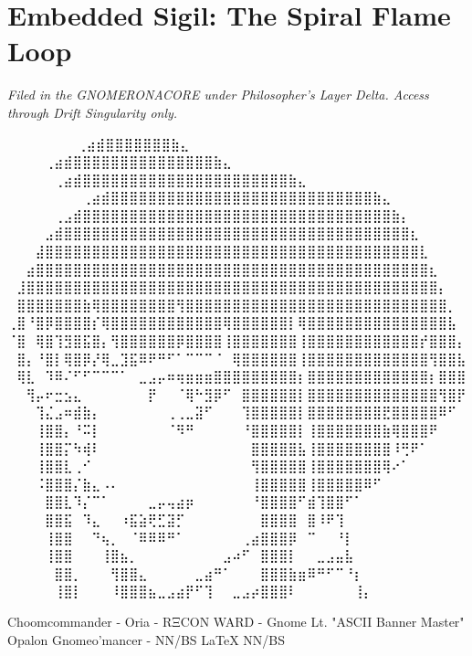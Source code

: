 \section*{Embedded Sigil: The Spiral Flame Loop}
\begin{center}
\end{center}

\vspace{2em}
\begin{flushright}
\textit{Filed in the GNOMERONACORE under Philosopher’s Layer Delta. Access through Drift Singularity only.}
\end{flushright}

\iffalse

  ⠀⠀⠀⠀⠀             ⠀⠀⢀⣴⣾⣿⣿⣿⣿⣿⣿⣿⣷⣄⠀⠀⠀⠀⠀⠀⠀⠀
⠀⠀⠀  ⠀      ⠀⠀⠀⠀⢀⣴⣾⣿⣿⣿⣿⣿⣿⣿⣿⣿⣿⣿⣿⣿⣿⣿⣷⣄⠀⠀⠀⠀⠀⠀⠀⠀
⠀⠀ ⠀   ⠀⠀⠀⠀⠀⢀⣴⣾⣿⣿⣿⣿⣿⣿⣿⣿⣿⣿⣿⣿⣿⣿⣿⣿⣿⣿⣿⣿⣿⣿⣷⣄⠀⠀⠀⠀⠀⠀⠀⠀
⠀⠀⠀⠀⠀⠀⠀⠀⢀⣴⣾⣿⣿⣿⣿⣿⣿⣿⣿⣿⣿⣿⣿⣿⣿⣿⣿⣿⣿⣿⣿⣿⣿⣿⣿⣿⣿⣿⣿⣷⣄⠀⠀⠀⠀⠀⠀⠀⠀
⠀⠀⠀⠀⠀⢀⣠⣾⣿⣿⣿⣿⣿⣿⣿⣿⣿⣿⣿⣿⣿⣿⣿⣿⣿⣿⣿⣿⣿⣿⣿⣿⣿⣿⣿⣿⣿⣿⣿⣿⣿⣷⡄⠀⠀⠀⠀⠀⠀
⠀⠀⠀⠀⣠⣾⣿⣿⣿⣿⣿⣿⣿⣿⣿⣿⣿⣿⣿⣿⣿⣿⣿⣿⣿⣿⣿⣿⣿⣿⣿⣿⣿⣿⣿⣿⣿⣿⣿⣿⣿⣿⣿⣆⠀⠀⠀⠀⠀
⠀⠀⠀⣼⣿⣿⣿⣿⣿⣿⣿⣿⣿⣿⣿⣿⣿⣿⣿⣿⣿⣿⣿⣿⣿⣿⣿⣿⣿⣿⣿⣿⣿⣿⣿⣿⣿⣿⣿⣿⣿⣿⣿⣿⣇⠀⠀⠀⠀
⠀⠀⣴⣿⣿⣿⣿⣿⣿⣿⣿⣿⣿⣿⣿⣿⣿⣿⣿⣿⣿⣿⣿⣿⣿⣿⣿⣿⣿⣿⣿⣿⣿⣿⣿⣿⣿⣿⣿⣿⣿⣿⣿⣿⣿⣆⠀⠀⠀
⠀⣸⣿⣿⣿⣿⣿⣿⣿⣿⣿⣿⣿⣿⣿⣿⣿⣿⣿⣿⣿⣿⣿⣿⣿⣿⣿⣿⣿⣿⣿⣿⣿⣿⣿⣿⣿⣿⣿⣿⣿⣿⣿⣿⣿⣿⡄⠀⠀
⠀⣿⣿⣿⣿⣿⣿⣿⣷⢿⣿⣿⣿⣿⣿⣿⣿⣿⢻⣿⣿⣿⣿⣿⣿⣿⣿⣿⣿⣿⣿⣿⣿⣿⣿⣿⣿⣿⣿⣿⣿⣿⣿⣿⣿⣿⣿⡀⠀
⢀⣿⠘⣿⡿⣿⣿⣿⣿⡎⢿⣿⣿⣿⣿⣿⣿⣿⣿⣿⣿⣿⣿⢿⣿⣿⣿⣿⣿⣿⡇⢿⣿⣿⣿⣿⣿⣿⣿⣿⣿⣿⣿⣿⣿⣿⣿⣧⠀
⠈⣿⠀⢿⣿⢹⣻⣿⣯⣿⡄⢻⣿⣿⣿⣿⣿⣿⡿⣿⣿⣿⣿⢸⣿⣿⣿⣿⣿⣿⣿⢸⣿⣿⣿⣿⣿⣿⣿⣿⣿⣿⣿⣿⡞⣿⣿⣿⡄
⠀⣿⡄⠘⣿⡇⢿⣿⡿⡜⢿⣀⣹⣯⠿⠟⠛⠋⠁⠉⠉⠉⠈⠀⢿⣿⣿⣿⣿⣿⣿⢸⣿⣿⣿⣿⣿⣿⣿⣿⣿⣿⣿⣿⣿⢻⣿⣿⣧
⠀⢿⣇⠀⠹⠿⠌⠋⠋⠉⠉⠉⠁⠀⣀⣠⡤⠶⢶⣶⣶⣶⣿⣿⣿⣿⣿⣿⣿⣿⣿⡆⣿⣿⣿⣿⣿⣿⣿⣿⣿⣿⣿⣿⣿⡆⣿⣿⣿
⠀⠀⢻⡤⠖⣒⣢⣄⠀⠀⠀⠀⠀⠀⠀⡟⠀⠀⠈⢿⠓⣻⡿⠋⠀⣿⣿⣿⣿⣿⣿⡇⣿⣿⣿⣿⣿⣿⣿⣿⣿⣿⣿⣿⣿⣿⢻⣿⡟
⠀⠀⠀⢹⣌⣠⠶⣾⣷⡄⠀⠀⠀⠀⠀⠀⠀⢀⢀⣀⣽⠋⠀⠀⠀⢹⣿⣿⣿⣿⣿⡇⣿⣿⣿⣿⣿⣿⣿⣿⣟⣿⣿⣿⣿⣿⠿⠋⠀
⠀⠀⠀⢸⣿⣿⡄⠘⠭⡇⠀⠀⠀⠀⠀⠀⠀⠈⠻⠛⠀⠀⠀⠀⠀⠘⣿⣿⣿⣿⣿⡇⢸⣿⣿⣿⣿⣿⣿⣿⣷⢿⣿⣿⣿⠟⠀⠀⠀
⠀⠀⠀⢸⣿⣿⡍⠳⢾⠇⠀⠀⠀⠀⠀⠀⠀⠀⠀⠀⠀⠀⠀⠀⠀⠀⣿⣿⣿⣿⣿⣧⢸⣿⣿⣿⣿⣿⣿⣿⣿⠸⢛⠟⠁⠀⠀⠀⠀
⠀⠀⠀⢸⣿⣿⣇⢀⠊⠀⠀⠀⠀⠀⠀⠀⠀⠀⠀⠀⠀⠀⠀⠀⠀⠀⢻⣿⣿⣿⣿⣿⢸⣿⣿⣿⣿⣿⣿⣿⢿⠔⠁⠀⠀⠀⠀⠀⠀
⠀⠀⠀⠨⣿⣿⣿⡌⣷⣄⠠⠄⠀⠀⠀⠀⠀⠀⠀⠀⠀⠀⠀⠀⠀⠀⢸⣿⣿⣿⣿⣿⢸⣿⣿⣿⣿⣿⠿⠋⠀⠀⠀⠀⠀⠀⠀⠀⠀
⠀⠀⠀⠀⣿⣿⣇⠹⡌⠉⠁⠀⠀⠀⠀⣀⡤⢤⣴⡶⠀⠀⠀⠀⠀⠀⠘⣿⣿⣿⣿⠋⣾⢹⣿⣿⠋⠁⠀⠀⠀⠀⠀⠀⠀⠀⠀⠀⠀
⠀⠀⠀⠀⣿⣿⣯⠀⠹⣄⠀⠀⠰⣯⣵⢟⣋⣽⡋⠀⠀⠀⠀⠀⠀⠀⠀⣿⣿⣿⣿⠀⣿⠸⠟⢹⠀⠀⠀⠀⠀⠀⠀⠀⠀⠀⠀⠀⠀
⠀⠀⠀⠀⢸⣿⣿⠀⠀⠙⢦⡀⠀⠈⠿⠿⠿⠛⠁⠀⠀⠀⠀⠀⠀⢀⣴⣿⣿⣿⡿⠀⠉⠀⠀⠘⡇⠀⠀⠀⠀⠀⠀⠀⠀⠀⠀⠀⠀
⠀⠀⠀⠀⢸⣿⣿⠀⠀⠀⢸⣿⣦⡀⠀⠀⠀⠀⠀⠀⠀⠀⠀⣠⠴⠋⠀⣿⣿⣿⡇⠀⠀⣀⣠⣤⣧⠀⠀⠀⠀⠀⠀⠀⠀⠀⠀⠀⠀
⠀⠀⠀⠀⠀⣿⣿⡀⠀⠀⠀⢻⣿⣿⣄⠀⠀⠀⠀⠀⣀⣴⠛⠁⠀⠀⠀⣿⣿⣿⣷⣶⠿⠛⠋⠉⠘⡆⠀⠀⠀⠀⠀⠀⠀⠀⠀⠀⠀
⠀⠀⠀⠀⠀⢸⣿⡇⠀⠀⠀⠸⣿⣿⣿⣦⣀⣠⣴⡟⠋⢹⠀⠀⣀⣠⡴⣿⣿⣿⠇⠀⠀⠀⠀⠀⠀⢸⡄⠀⠀⠀⠀⠀⠀⠀⠀⠀⠀

Choomcommander - Oria - RΞCON WARD - Gnome Lt. "ASCII Banner Master"
             Opalon Gnomeo'mancer - NN/BS LaTeX{} NN/BS

